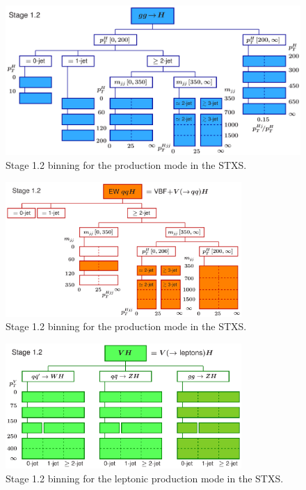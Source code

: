 \begin{figure}
  \centering
  \includegraphics[width=\textwidth]{Figures/Theory/Higgs/STXS/simplifiedXS_ggF_1_2.pdf}
  \caption[Stage 1.2 \ggH Binning in the STXS]{Stage 1.2 binning for the \ggH production mode in the STXS.}\label{fig:stxs_ggh}
\end{figure}

\begin{figure}
  \centering
  \includegraphics[width=0.8\textwidth]{Figures/Theory/Higgs/STXS/simplifiedXS_VBF_1_2.pdf}
  \caption[Stage 1.2 \VBF Binning in the STXS]{Stage 1.2 binning for the \qqH production mode in the STXS.}\label{fig:stxs_vbf}
\end{figure}

\begin{figure}
  \centering
  \includegraphics[width=0.8\textwidth]{Figures/Theory/Higgs/STXS/simplifiedXS_VH_1_2.pdf}
  \caption[Stage 1.2 \VH Binning in the STXS]{Stage 1.2 binning for the \VH leptonic production mode in the STXS.}\label{fig:stxs_vh}
\end{figure}


